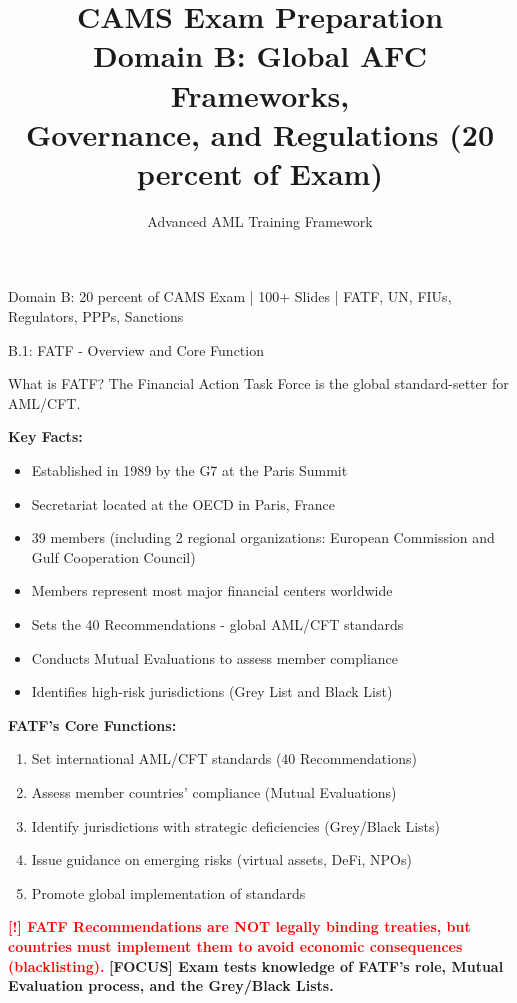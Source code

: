 \documentclass[11pt,a4paper]{beamer}
\title[CAMS Domain B]{CAMS Exam Preparation\\Domain B: Global AFC Frameworks,\\Governance, and Regulations (20 percent of Exam)}
\author{Advanced AML Training Framework}
\date{}
\newcommand{\redflag}[1]{\textcolor{red}{\textbf{[!] #1}}}
\newcommand{\examfocus}[1]{\textcolor{orange!80!black}{\textbf{[FOCUS] #1}}}
\begin{document}
	
	\begin{frame}
		\titlepage
		\centering
		\tiny Domain B: 20 percent of CAMS Exam | 100+ Slides | FATF, UN, FIUs, Regulators, PPPs, Sanctions
	\end{frame}
	
	
	\begin{frame}{B.1: FATF - Overview and Core Function}
		\begin{block}{What is FATF?}
			The Financial Action Task Force is the global standard-setter for AML/CFT.
		\end{block}
		\textbf{Key Facts:}
		\begin{itemize}
			\item Established in 1989 by the G7 at the Paris Summit
			\item Secretariat located at the OECD in Paris, France
			\item 39 members (including 2 regional organizations: European Commission and Gulf Cooperation Council)
			\item Members represent most major financial centers worldwide
			\item Sets the 40 Recommendations - global AML/CFT standards
			\item Conducts Mutual Evaluations to assess member compliance
			\item Identifies high-risk jurisdictions (Grey List and Black List)
		\end{itemize}
		\textbf{FATF's Core Functions:}
		\begin{enumerate}
			\item Set international AML/CFT standards (40 Recommendations)
			\item Assess member countries' compliance (Mutual Evaluations)
			\item Identify jurisdictions with strategic deficiencies (Grey/Black Lists)
			\item Issue guidance on emerging risks (virtual assets, DeFi, NPOs)
			\item Promote global implementation of standards
		\end{enumerate}
		\redflag{FATF Recommendations are NOT legally binding treaties, but countries must implement them to avoid economic consequences (blacklisting).}
		\examfocus{Exam tests knowledge of FATF's role, Mutual Evaluation process, and the Grey/Black Lists.}
	\end{frame}
	
\end{document}
